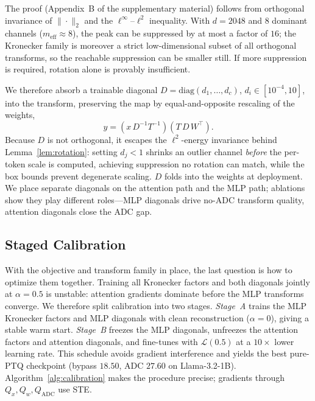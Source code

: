 \documentclass[letterpaper]{article} %
\theoremstyle{plain}
\begin{document}
The proof (Appendix~B of the supplementary material) follows from orthogonal invariance of $\|\cdot\|_2$ and the $\ell^\infty$--$\ell^2$ inequality. With $d = 2048$ and $8$ dominant channels ($m_{\mathrm{eff}} \approx 8$), the peak can be suppressed by at most a factor of $16$; the Kronecker family is moreover a strict low-dimensional subset of all orthogonal transforms, so the reachable suppression can be smaller still. If more suppression is required, rotation alone is provably insufficient.

We therefore absorb a trainable diagonal $D = \mathrm{diag}(d_1,\ldots,d_c)$, $d_i \in [10^{-4}, 10]$, into the transform, preserving the map by equal-and-opposite rescaling of the weights,
\begin{equation}
    y = (x\,D^{-1}T^{-1})(T\,D\,W^{\top}).
    \label{eq:diag}
\end{equation}
Because $D$ is not orthogonal, it escapes the $\ell^2$-energy invariance behind Lemma~\ref{lem:rotation}: setting $d_j < 1$ shrinks an outlier channel \emph{before} the per-token scale is computed, achieving suppression no rotation can match, while the box bounds prevent degenerate scaling. $D$ folds into the weights at deployment. We place separate diagonals on the attention path and the MLP path; ablations show they play different roles---MLP diagonals drive no-ADC transform quality, attention diagonals close the ADC gap.

\subsection{Staged Calibration}

With the objective and transform family in place, the last question is how to optimize them together. Training all Kronecker factors and both diagonals jointly at $\alpha = 0.5$ is unstable: attention gradients dominate before the MLP transforms converge. We therefore split calibration into two stages. \emph{Stage~A} trains the MLP Kronecker factors and MLP diagonals with clean reconstruction ($\alpha = 0$), giving a stable warm start. \emph{Stage~B} freezes the MLP diagonals, unfreezes the attention factors and attention diagonals, and fine-tunes with $\mathcal{L}(0.5)$ at a $10\times$ lower learning rate. This schedule avoids gradient interference and yields the best pure-PTQ checkpoint (bypass $18.50$, ADC $27.60$ on Llama-3.2-1B). Algorithm~\ref{alg:calibration} makes the procedure precise; gradients through $Q_x,Q_w,Q_{\mathrm{ADC}}$ use STE.
\end{document}
